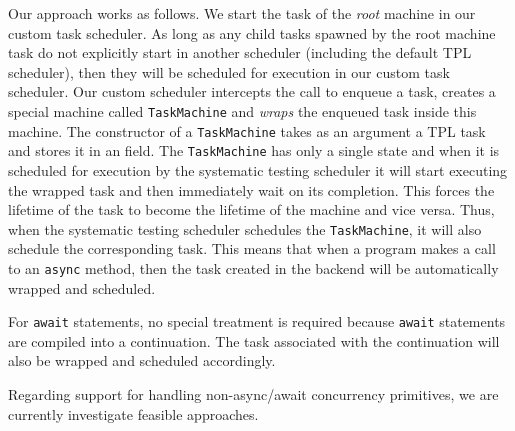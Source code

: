 Our approach works as follows. We start the task of the \emph{root} \psharp machine in our custom task scheduler. As long as any child tasks spawned by the root machine task do not explicitly start in another scheduler (including the default TPL scheduler), then they will be scheduled for execution in our custom task scheduler. Our custom scheduler intercepts the call to enqueue a task, creates a special machine called \texttt{TaskMachine} and \emph{wraps} the enqueued task inside this machine. The constructor of a \texttt{TaskMachine} takes as an argument a TPL task and stores it in an field. The \texttt{TaskMachine} has only a single state and when it is scheduled for execution by the \psharp systematic testing scheduler it will start executing the wrapped task and then immediately wait on its completion. This forces the lifetime of the task to become the lifetime of the machine and vice versa. Thus, when the \psharp systematic testing scheduler schedules the \texttt{TaskMachine}, it will also schedule the corresponding task. This means that when a \psharp program makes a call to an \texttt{async} method, then the task created in the backend will be automatically wrapped and scheduled.

For \texttt{await} statements, no special treatment is required because \texttt{await} statements are compiled into a continuation. The task associated with the continuation will also be wrapped and scheduled accordingly.

Regarding support for handling non-async/await concurrency primitives, we are currently investigate feasible approaches.
